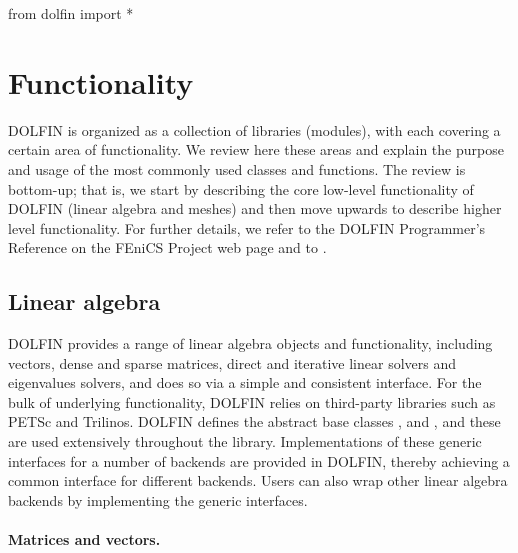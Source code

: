 \pagebreak
\begin{python}
from dolfin import *
\end{python}

\section{Functionality}
\label{sec:logg-2:functionality}

DOLFIN is organized as a collection of libraries (modules), with each
covering a certain area of functionality. We review here these areas
and explain the purpose and usage of the most commonly used classes and
functions. The review is bottom-up; that is, we start by describing the
core low-level functionality of DOLFIN (linear algebra and meshes) and
then move upwards to describe higher level functionality. For further
details, we refer to the DOLFIN Programmer's Reference on the FEniCS
Project web page and to \citet{LoggWells2010}.

\subsection{Linear algebra}

DOLFIN provides a range of linear algebra objects and functionality,
including vectors, dense and sparse matrices, direct and iterative linear
solvers and eigenvalues solvers, and does so via a simple and consistent
interface.  For the bulk of underlying functionality, DOLFIN relies
on third-party libraries such as PETSc and Trilinos.  DOLFIN defines
the abstract base classes , 
and , and these are used extensively throughout the
library.  Implementations of these generic interfaces for a number of
backends are provided in DOLFIN, thereby achieving a common interface for
different backends.  Users can also wrap other linear algebra backends
by implementing the generic interfaces.

\paragraph{Matrices and vectors.}

